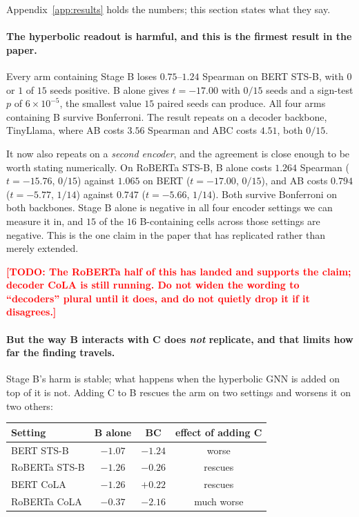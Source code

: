 \documentclass{article}
\newcommand{\TODO}[1]{\textcolor{red}{\textbf{[TODO: #1]}}}
\begin{document}
Appendix~\ref{app:results} holds the numbers; this section states what they say.

\paragraph{The hyperbolic readout is harmful, and this is the firmest result in
the paper.} Every arm containing Stage B loses $0.75$--$1.24$ Spearman on BERT
STS-B, with $0$ or $1$ of $15$ seeds positive. B alone gives $t = -17.00$ with
$0/15$ seeds and a sign-test $p$ of $6\times10^{-5}$, the smallest value $15$
paired seeds can produce. All four arms containing B survive Bonferroni. The
result repeats on a decoder backbone, TinyLlama, where AB costs $3.56$ Spearman
and ABC costs $4.51$, both $0/15$.

It now also repeats on a \emph{second encoder}, and the agreement is close
enough to be worth stating numerically. On RoBERTa STS-B, B alone costs $1.264$
Spearman ($t=-15.76$, $0/15$) against $1.065$ on BERT ($t=-17.00$, $0/15$), and
AB costs $0.794$ ($t=-5.77$, $1/14$) against $0.747$ ($t=-5.66$, $1/14$). Both
survive Bonferroni on both backbones. Stage B alone is negative in all four
encoder settings we can measure it in, and $15$ of the $16$ B-containing cells
across those settings are negative. This is the one claim in the paper that has
replicated rather than merely extended.

\TODO{The RoBERTa half of this has landed and supports the claim; decoder CoLA
is still running. Do not widen the wording to ``decoders'' plural until it
does, and do not quietly drop it if it disagrees.}

\paragraph{But the way B interacts with C does \emph{not} replicate, and that
limits how far the finding travels.} Stage B's harm is stable; what happens when
the hyperbolic GNN is added on top of it is not. Adding C to B rescues the arm
on two settings and worsens it on two others:

\begin{center}
\small
\begin{tabular}{lccc}
\toprule
Setting & B alone & BC & effect of adding C \\
\midrule
BERT STS-B    & $-1.07$ & $-1.24$ & worse \\
RoBERTa STS-B & $-1.26$ & $-0.26$ & rescues \\
BERT CoLA     & $-1.26$ & $+0.22$ & rescues \\
RoBERTa CoLA  & $-0.37$ & $-2.16$ & much worse \\
\bottomrule
\end{tabular}
\end{center}
\end{document}
